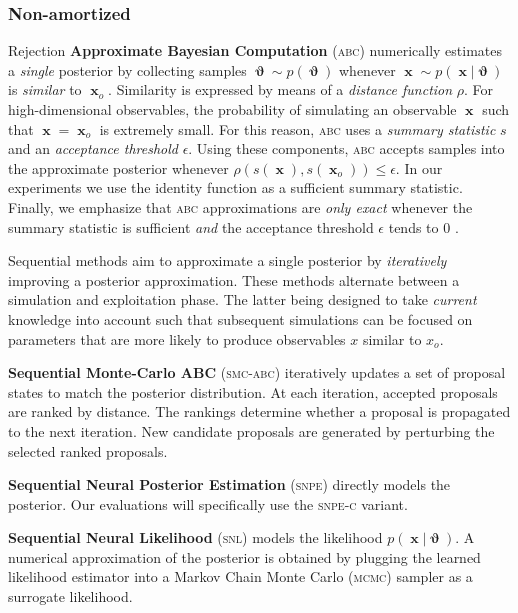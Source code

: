 \documentclass[twoside]{article}
\DeclareMathOperator{\vtheta}{\boldsymbol\vartheta}
\DeclareMathOperator{\vx}{\boldsymbol x}
\newcommand{\snpe}{\textsc{snpe}}
\begin{document}
\subsubsection{Non-amortized}
Rejection {\bf Approximate Bayesian Computation} \textsc{(abc)} \citep{rubin1984,pritchard1999population}
numerically estimates a \emph{single} posterior by collecting samples $\vtheta\sim p(\vtheta)$ whenever
$\vx\sim p(\vx\vert\vtheta)$ is \emph{similar} to $\vx_o$. Similarity is expressed by means of a \emph{distance function} $\rho$. For high-dimensional observables, the probability of simulating an observable $\vx$ such that $\vx = \vx_o$ is extremely small. For this reason, \textsc{abc} uses a \emph{summary statistic} $s$ and an \emph{acceptance threshold} $\epsilon$. Using these components, \textsc{abc} accepts samples into the approximate posterior whenever $\rho(s(\vx),s(\vx_o))\leq\epsilon$. In our experiments we use the identity function as a sufficient summary statistic. Finally, we emphasize that
\textsc{abc} approximations are \emph{only exact} whenever the summary statistic is sufficient \emph{and} the acceptance threshold $\epsilon$ tends to 0 \citep{sisson2018overview}.

Sequential methods aim to approximate a single posterior by \emph{iteratively} improving a posterior approximation. These methods alternate between a simulation and exploitation phase. The latter being designed to take \emph{current} knowledge into account such that subsequent simulations can be focused on parameters that are more likely to produce observables $x$ similar to $x_o$.

{\bfseries Sequential Monte-Carlo ABC} (\textsc{smc-abc}) \citep{10.1093/bioinformatics/btp619, sisson2007sequential, beaumont2009adaptive}
iteratively updates a set of proposal states to match the posterior distribution. At each iteration, accepted proposals are ranked by distance. The rankings determine whether a proposal is propagated to the next iteration. New candidate proposals are generated by perturbing the selected ranked proposals.

{\bfseries Sequential Neural Posterior Estimation} (\snpe) \citep{papamakarios2016fast, lueckmann2017flexible, greenberg2019automatic} directly models the posterior.
Our evaluations will specifically use the \textsc{snpe-c} \citep{greenberg2019automatic} variant.

{\bfseries Sequential Neural Likelihood} (\textsc{snl}) \citep{papamakarios2019sequential} models the likelihood $p(\vx|\vtheta)$. A numerical approximation of the posterior is obtained by plugging the learned likelihood estimator into a Markov Chain Monte Carlo (\textsc{mcmc}) sampler as a surrogate likelihood.
\end{document}
